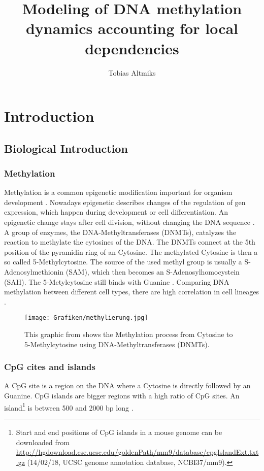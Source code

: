 \documentclass[12pt]{article} %
\begin{document}
	\setlength{\parindent}{0pt} 
	
	\title{Modeling of DNA methylation dynamics accounting for local dependencies}
	\author{Tobias Altmiks}
	\maketitle
	\tableofcontents 

	\section{Introduction}
	\subsection{Biological Introduction}
	\subsubsection{Methylation}
	Methylation is a common epigenetic modification important for organism development \citep{smith2013}. Nowadays epigenetic describes changes of the regulation of gen expression, which happen during development or cell differentiation. An epigenetic change stays after cell division, without changing the DNA sequence \citep{graw2015}. A group of enzymes, the DNA-Methyltransferases (DNMTs), catalyzes the reaction to methylate the cytosines of the DNA. The DNMTs connect at the 5th position of the pyramidin ring of an Cytosine. The methylated Cytosine is then a so called 5-Methylcytosine. The source of the used methyl group is usually a S-Adenosylmethionin (SAM), which then becomes an S-Adenosylhomocystein (SAH). The 5-Metylcytosine still binds with Guanine \citep{graw2015}. Comparing DNA methylation between different cell types, there are high correlation in cell lineages \citep{bock2012}.
	\begin{figure}[h]
		\texttt{[image: Grafiken/methylierung.jpg]}
		\caption{ This graphic from \cite{graw2015} shows the Methylation process from Cytosine to 5-Methylcytosine using DNA-Methyltransferases (DNMTs).}
		\label{img:methylation}
	\end{figure}
	
	\subsubsection{CpG cites and islands}
	A CpG site is a region on the DNA where a Cytosine is directly followed by an Guanine. CpG islands are bigger regions with a high ratio of CpG sites. An island\footnote{Start and end positions of CpG islands in a mouse genome can be downloaded from \url{http://hgdownload.cse.ucsc.edu/goldenPath/mm9/database/cpgIslandExt.txt.gz} (14/02/18, UCSC genome annotation database, NCBI37/mm9).}  is between 500 and 2000 bp long \citep{graw2015}.
	
\end{document}
